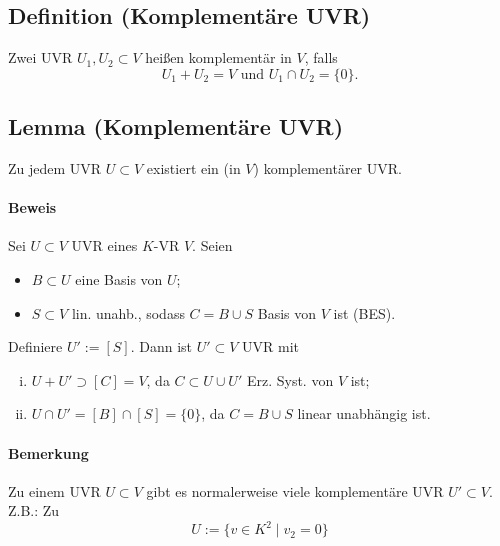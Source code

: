 \subsection{Definition (Komplementäre UVR)}
	\begin{Definition}
		Zwei UVR $ U_1,U_2 \subset V $ heißen komplementär in $ V $, falls
		\begin{equation*}
		U_1+U_2=V\text{ und } U_1\cap U_2 = \{0\}.
		\end{equation*}
	\end{Definition}
		
\subsection{Lemma (Komplementäre UVR)}
	\begin{Lemma}
		Zu jedem UVR $ U\subset V $ existiert ein (in $ V $) komplementärer UVR.
	\end{Lemma}
	
\paragraph{Beweis}
	Sei $ U\subset V $ UVR eines $ K $-VR $ V $.
	Seien 
		\begin{itemize}
		\item $ B\subset U $ eine Basis von $ U $;
		\item $ S\subset V $ lin. unahb., sodass $ C=B\cup S $ Basis von $ V $ ist (BES).
		\end{itemize}
	
	Definiere $ U':= [S] $. Dann ist $ U'\subset V $ UVR mit
		\begin{enumerate}[(i)]
		\item $ U+U' \supset [C] = V $, da $ C\subset U\cup U' $ Erz. Syst. von $ V $ ist;
		\item $ U\cap U' = [B]\cap [S] = \{0\}$, da $ C=B\cup S $ linear unabhängig ist.
		\end{enumerate}
		
\paragraph{Bemerkung}
	Zu einem UVR $ U\subset V $ gibt es normalerweise viele komplementäre UVR $ U'\subset V $.
	Z.B.: Zu
		\begin{equation*}
		U:= \{v\in K^2\mid v_2 = 0\}
		\end{equation*}
	
